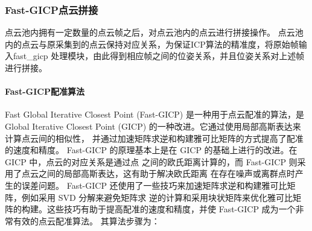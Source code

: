 \subsubsection{Fast-GICP点云拼接}
点云池内拥有一定数量的点云帧之后，对点云池内的点云进行拼接操作。
点云池内的点云与原采集到的点云保持对应关系，为保证ICP算法的精准度，将原始帧输入fast\_gicp
处理模块，由此得到相应帧之间的位姿关系，并且位姿关系对上述帧进行拼接。

\paragraph{Fast-GICP配准算法}
Fast Global Iterative Closest Point (Fast-GICP) 是一种用于点云配准的算法，是 Global 
Iterative Closest Point (GICP) 的一种改进。它通过使用局部高斯表达来计算点云间的相似性，
并通过加速矩阵求逆和构建雅可比矩阵的方式提高了配准的速度和精度。
Fast-GICP 的原理基本上是在 GICP 的基础上进行的改进。在 GICP 中，点云的对应关系是通过点
之间的欧氏距离计算的，而 Fast-GICP 则采用了点云之间的局部高斯表达，这有助于解决欧氏距离
在存在噪声或离群点时产生的误差问题。
Fast-GICP 还使用了一些技巧来加速矩阵求逆和构建雅可比矩阵，例如采用 SVD 分解来避免矩阵求
逆的计算和采用块状矩阵来优化雅可比矩阵的构建。这些技巧有助于提高配准的速度和精度，并使 
Fast-GICP 成为一个非常有效的点云配准算法。
其算法步骤为：

